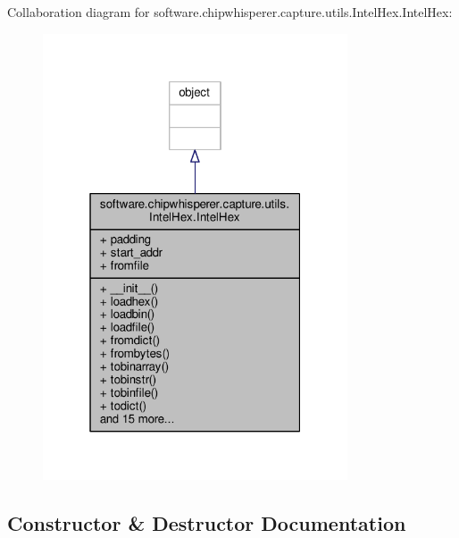 Collaboration diagram for software.\+chipwhisperer.\+capture.\+utils.\+Intel\+Hex.\+Intel\+Hex\+:\nopagebreak
\begin{figure}[H]
\begin{center}
\leavevmode
\includegraphics[width=256pt]{d6/d97/classsoftware_1_1chipwhisperer_1_1capture_1_1utils_1_1IntelHex_1_1IntelHex__coll__graph}
\end{center}
\end{figure}


\subsection{Constructor \& Destructor Documentation}
\hypertarget{classsoftware_1_1chipwhisperer_1_1capture_1_1utils_1_1IntelHex_1_1IntelHex_abd7fd7245695b21792563d424b09ac27}{}
